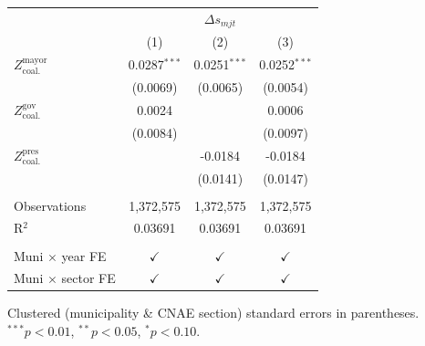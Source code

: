 \begingroup
\centering
\begin{tabular}{lccc}
   \toprule
    & \multicolumn{3}{c}{$\Delta s_{mjt}$}\\
                                       & (1)            & (2)            & (3)\\  
   \midrule 
   $Z^{\text{mayor}}_{\text{coal.}}$   & 0.0287$^{***}$ & 0.0251$^{***}$ & 0.0252$^{***}$\\   
                                       & (0.0069)       & (0.0065)       & (0.0054)\\   
   $Z^{\text{gov}}_{\text{coal.}}$     & 0.0024         &                & 0.0006\\   
                                       & (0.0084)       &                & (0.0097)\\   
   $Z^{\text{pres}}_{\text{coal.}}$    &                & -0.0184        & -0.0184\\   
                                       &                & (0.0141)       & (0.0147)\\   
    \\
   Observations                        & 1,372,575      & 1,372,575      & 1,372,575\\  
   R$^2$                               & 0.03691        & 0.03691        & 0.03691\\  
    \\
   Muni $\times$ year FE               & $\checkmark$   & $\checkmark$   & $\checkmark$\\   
   Muni $\times$ sector FE             & $\checkmark$   & $\checkmark$   & $\checkmark$\\   
   \bottomrule
\end{tabular}
 
\par \raggedright 
Clustered (municipality \& CNAE section) standard errors in parentheses. $^{***}p<0.01$, $^{**}p<0.05$, $^{*}p<0.10$.
\par\endgroup
